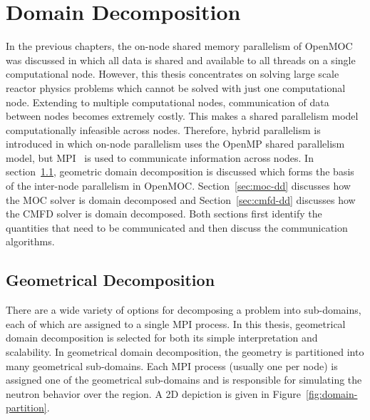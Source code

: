 \chapter{Domain Decomposition}
\label{chap:domain-decomposition}

In the previous chapters, the on-node shared memory parallelism of OpenMOC was discussed in which all data is shared and available to all threads on a single computational node. However, this thesis concentrates on solving large scale reactor physics problems which cannot be solved with just one computational node. Extending to multiple computational nodes, communication of data between nodes becomes extremely costly. This makes a shared parallelism model computationally infeasible across nodes. Therefore, hybrid parallelism is introduced in which on-node parallelism uses the OpenMP shared parallelism model, but \ac{MPI}~\cite{mpi} is used to communicate information across nodes. In section~\ref{sec:geometrical-decomposition}, geometric domain decomposition is discussed which forms the basis of the inter-node parallelism in OpenMOC. Section~\ref{sec:moc-dd} discusses how the \ac{MOC} solver is domain decomposed and Section~\ref{sec:cmfd-dd} discusses how the \ac{CMFD} solver is domain decomposed. Both sections first identify the quantities that need to be communicated and then discuss the communication algorithms.

\section{Geometrical Decomposition}
\label{sec:geometrical-decomposition}

There are a wide variety of options for decomposing a problem into sub-domains, each of which are assigned to a single \ac{MPI} process. In this thesis, geometrical domain decomposition is selected for both its simple interpretation and scalability. In geometrical domain decomposition, the geometry is partitioned into many geometrical sub-domains. Each \ac{MPI} process (usually one per node) is assigned one of the geometrical sub-domains and is responsible for simulating the neutron behavior over the region. A 2D depiction is given in Figure~\ref{fig:domain-partition}.

